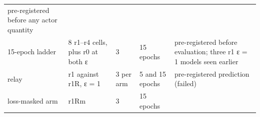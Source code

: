 \documentclass[10pt]{article}
\begin{document}
\begin{longtable}[]{@{}lllll@{}}
\begin{minipage}[t]{0.17\columnwidth}
pre-registered before any actor quantity\strut
\end{minipage}\tabularnewline
\begin{minipage}[t]{0.17\columnwidth}\raggedright
15-epoch ladder\strut
\end{minipage} & \begin{minipage}[t]{0.17\columnwidth}\raggedright
8 r1--r4 cells, plus r0 at both ε\strut
\end{minipage} & \begin{minipage}[t]{0.17\columnwidth}\raggedright
3\strut
\end{minipage} & \begin{minipage}[t]{0.17\columnwidth}\raggedright
15 epochs\strut
\end{minipage} & \begin{minipage}[t]{0.17\columnwidth}\raggedright
pre-registered before evaluation; three r1 ε = 1 models seen earlier\strut
\end{minipage}\tabularnewline
\begin{minipage}[t]{0.17\columnwidth}\raggedright
relay\strut
\end{minipage} & \begin{minipage}[t]{0.17\columnwidth}\raggedright
r1 against r1R, ε = 1\strut
\end{minipage} & \begin{minipage}[t]{0.17\columnwidth}\raggedright
3 per arm\strut
\end{minipage} & \begin{minipage}[t]{0.17\columnwidth}\raggedright
5 and 15 epochs\strut
\end{minipage} & \begin{minipage}[t]{0.17\columnwidth}\raggedright
pre-registered prediction (failed)\strut
\end{minipage}\tabularnewline
\begin{minipage}[t]{0.17\columnwidth}\raggedright
loss-masked arm\strut
\end{minipage} & \begin{minipage}[t]{0.17\columnwidth}\raggedright
r1Rm\strut
\end{minipage} & \begin{minipage}[t]{0.17\columnwidth}\raggedright
3\strut
\end{minipage} & \begin{minipage}[t]{0.17\columnwidth}\raggedright
15 epochs\strut
\end{minipage} & \begin{minipage}[t]{0.17\columnwidth}\raggedright

\end{minipage}
\end{longtable}
\end{document}
